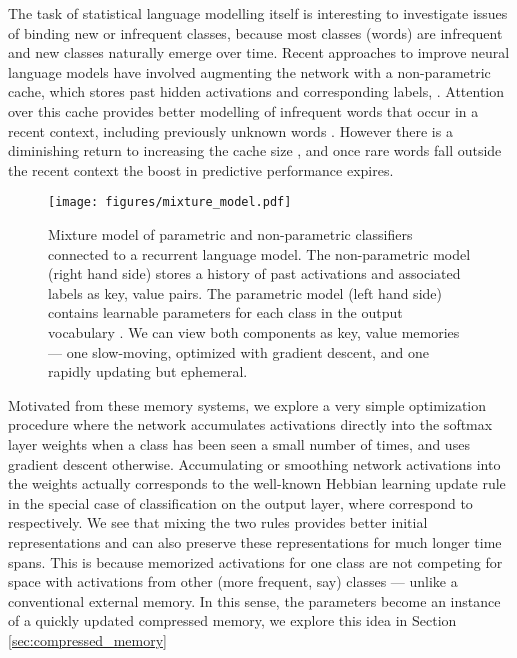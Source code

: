 \documentclass{article} \usepackage{hyperref}
\begin{document}
The task of statistical language modelling itself is interesting to investigate issues of binding new or infrequent classes, because most classes (words) are infrequent \citep{zipf1935psychology} and new classes naturally emerge over time. Recent approaches to improve neural language models have involved augmenting the network with a non-parametric cache, which stores past hidden activations  and corresponding labels,  \citep{vinyals2015pointer, merity2016pointer, grave2016improving, kawakami2017learning, grave2017unbounded}. Attention over this cache provides better modelling of infrequent words that occur in a recent context, including previously unknown words \citep{gulcehre2016pointing}. However there is a diminishing return to increasing the cache size \citep{grave2016improving}, and once rare words fall outside the recent context the boost in predictive performance expires.

\begin{figure}
    \centering
    \texttt{[image: figures/mixture\_model.pdf]}
    \caption{Mixture model of parametric and non-parametric classifiers connected to a recurrent language model. The non-parametric model (right hand side) stores a history of past activations and associated labels as key, value pairs. The parametric model (left hand side) contains learnable parameters  for each class in the output vocabulary . We can view both components as key, value memories --- one slow-moving, optimized with gradient descent, and one rapidly updating but ephemeral.}
    \label{fig:mixture}
\end{figure}

Motivated from these memory systems, we explore a very simple optimization procedure where the network accumulates activations  directly into the softmax layer weights  when a class  has been seen a small number of times, and uses gradient descent otherwise. Accumulating or smoothing network activations into the weights actually corresponds to the well-known Hebbian learning update rule   \citep{hebb1949organization} in the special case of classification on the output layer, where  correspond to  respectively. We see that mixing the two rules provides better initial representations and can also preserve these representations for much longer time spans. This is because memorized activations for one class are not competing for space with activations from other (more frequent, say) classes --- unlike a conventional external memory. In this sense, the parameters become an instance of a quickly updated compressed memory, we explore this idea in Section \ref{sec:compressed_memory}
\end{document}
